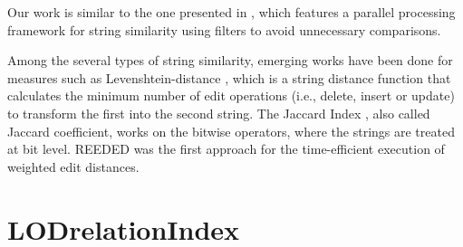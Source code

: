 Our work is similar to the one presented in \cite{10.1371/journal.pone.0172526}, which features a parallel processing framework for string similarity using filters to avoid unnecessary comparisons. 

Among the several types of string similarity, emerging works have been done for measures such as Levenshtein-distance \cite{levenshtein1966binary}, which is a string distance function that calculates the minimum number of edit operations (i.e., delete, insert or update) to transform the first into the second string. 
The Jaccard Index \cite{jaccard1912distribution}, also called Jaccard coefficient, works on the bitwise operators, where the strings are treated at bit level. 
REEDED \cite{soru2013rapid} was the first approach for the time-efficient execution of weighted edit distances. 

\section{LODrelationIndex}
